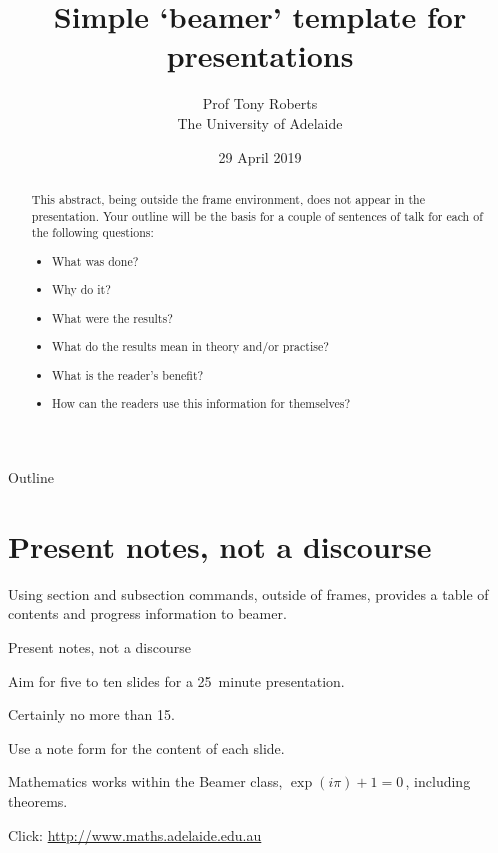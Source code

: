 \documentclass[aspectratio=169,ignorenonframetext,12pt]{beamer}
\title{Simple `beamer' template for presentations}
\author{Prof Tony Roberts\\
The University of Adelaide}
\date{29 April 2019}
\begin{document}
\begin{frame}
\maketitle
\end{frame}


\begin{abstract}
This abstract, being outside the frame environment, does not appear in the presentation.  Your outline will be the basis for a couple of sentences of talk for each of the following questions:
\begin{itemize}
\item What was done?
\item Why do it?
\item What were the results?
\item What do the results mean in theory and/or practise?
\item What is the reader's benefit?
\item How can the readers use this information for themselves? 
\end{itemize}
\end{abstract}


\begin{frame}{Outline}
\tableofcontents
\end{frame}



\section{Present notes, not a discourse}
Using section and subsection commands, outside of frames, provides a table of contents and progress information to beamer.
\begin{frame}{Present notes, not a discourse}

Aim for five to ten slides for a 25~minute presentation.

Certainly no more than 15.

Use a note form for the content of each slide.

\begin{theorem}
Mathematics works within the Beamer class, $\exp(i\pi)+1=0$\,, including theorems.
\end{theorem}

Click: \url{http://www.maths.adelaide.edu.au} 
\end{frame}
\end{document}
